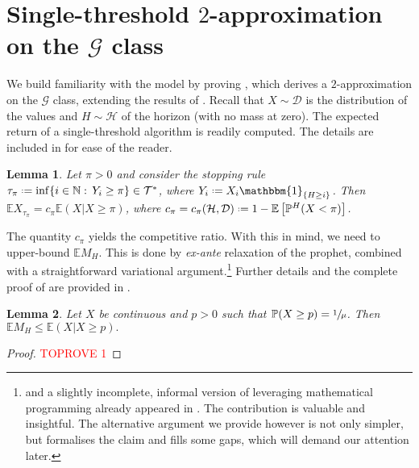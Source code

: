 \documentclass[11pt, a4paper, twoside]{article}
\newcommand*{\defeq}{\mathrel{\vcenter{\baselineskip0.5ex \lineskiplimit0pt
			\hbox{\scriptsize.}\hbox{\scriptsize.}}}=}
\newcommand{\NN}{\mathbb{N}}
\newcommand{\EE}{\mathbb{E}}
\newcommand{\PP}{\mathbb{P}}
\newcommand{\TT}{\mathcal{T}}
\newcommand{\HH}{\mathcal{H}}
\newcommand{\DD}{\mathcal{D}}
\newcommand{\PGF}{\mathcal{G}}
\newcommand{\II}{\mathbbm{1}}
\newtheorem{lemma}{Lemma}[section]
\numberwithin{equation}{section}
\begin{document}
	\section{Single-threshold $2$-approximation on the $\PGF$ class}\label{Gclass}
	We build familiarity with the model by proving , which derives a $2$-approximation on the $\PGF$ class, extending the results of \cite[Section~3]{AliBanGolMunWan20}. Recall that $X\sim\DD$ is the distribution of the values and $H\sim\HH$ of the horizon (with no mass at zero). The expected return of a single-threshold algorithm is readily computed. The details are included in  for ease of the reader.
	\begin{lemma}\label{algp}
		Let $\pi>0$ and consider the stopping rule $\tau_\pi\defeq\inf\{i\in\NN:\,Y_i\ge \pi\}\in\TT^*$, where $Y_i\defeq X_i\II_{\{H\ge i\}}$. Then $\EE X_{\tau_\pi}= c_\pi\EE(X|X\ge \pi)$, where $c_\pi=c_\pi(\HH,\DD)\defeq 1-\EE\left[\PP^H(X<\pi)\right]$.
	\end{lemma}
	
	The quantity $c_\pi$ yields the competitive ratio. With this in mind, we need to upper-bound $\EE M_H$. This is done by \textit{ex-ante} relaxation of the prophet, combined with a straightforward variational argument.\footnote{ and a slightly incomplete, informal version of  leveraging mathematical programming already appeared in \cite[Theorem~3.2]{AliBanGolMunWan20}. The contribution is valuable and insightful. The alternative argument we provide however is not only simpler, but formalises the claim and fills some gaps, which will demand our attention later.} Further details and the complete proof of  are provided in .
	\begin{lemma}\label{max}
		Let $X$ be continuous and $p>0$ such that $\PP(X\geq p)=\sfrac{1}{\mu}$. Then $\EE M_H\le\EE(X|X\ge p).$
	\end{lemma}
        \begin{proof}\textcolor{red}{TOPROVE 1}\end{proof}
	
\end{document}
